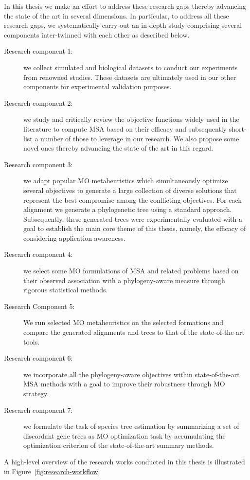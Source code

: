 In this thesis we make an effort to address these research gaps thereby advancing the state of the art in several dimensions. In particular, to address all these research gaps, we systematically carry out an in-depth study comprising several components inter-twinned with each other as described below.      
\begin{description}
\item [Research component 1:] we collect simulated and biological datasets to conduct our experiments from renowned studies. These datasets are ultimately used in our other components for experimental validation purposes.
\item [Research component 2:] we study and critically review the objective functions widely used in the literature to compute MSA based on their efficacy and subsequently short-list a number of those to leverage in our research. We also propose some novel ones thereby advancing the state of the art in this regard.
\item [Research component 3:] we adapt popular MO metaheuristics which simultaneously optimize several objectives to generate a large collection of diverse solutions that represent the best compromise among the conflicting objectives. For each alignment we generate a phylogenetic tree using a standard approach. Subsequently, these generated trees were experimentally evaluated with a goal to establish the main core theme of this thesis, namely, the efficacy of considering application-awareness.
\item [Research component 4:] we select some MO formulations of MSA and related problems based on their observed association with a phylogeny-aware measure through rigorous statistical methods.
\item [Research Component 5:] We run selected  MO metaheuristics on the selected formations and compare the generated alignments and trees to that of the state-of-the-art tools.
\item [Research component 6:] we incorporate all the phylogeny-aware objectives within state-of-the-art MSA methods with a goal to improve their robustness through MO strategy.
\item [Research component 7:] we formulate the task of species tree estimation by summarizing a set of discordant gene trees as MO optimization task by accumulating the optimization criterion of the state-of-the-art summary methods.
\end{description}

A high-level overview of the research works conducted in this thesis is illustrated in Figure~\ref{fig:research-workflow}

